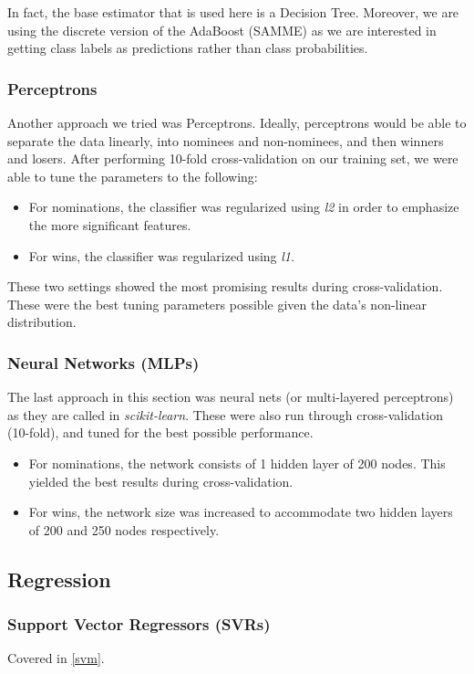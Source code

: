 \documentclass[journal,transmag]{IEEEtran}
\begin{document}
In fact, the base estimator that is used here is a Decision Tree. Moreover, we are using the discrete version of the AdaBoost (SAMME) as we are interested in getting class labels as predictions rather than class probabilities.
			
			\subsubsection{Perceptrons}
			Another approach we tried was Perceptrons. Ideally, perceptrons would be able to separate the data linearly, into nominees and non-nominees, and then winners and losers. After performing 10-fold cross-validation on our training set, we were able to tune the parameters to the following:
			\begin{itemize}
				\item For nominations, the classifier was regularized using \emph{l2} in order to emphasize the more significant features.
				\item For wins, the classifier was regularized using \emph{l1}.
			\end{itemize}
			These two settings showed the most promising results during cross-validation.
			These were the best tuning parameters possible given the data's non-linear distribution.
			
			\subsubsection{Neural Networks (MLPs)}
			The last approach in this section was neural nets (or multi-layered perceptrons) as they are called in \emph{scikit-learn}. These were also run through cross-validation (10-fold), and tuned for the best possible performance.
			\begin{itemize}
				\item For nominations, the network consists of 1 hidden layer of 200 nodes. This yielded the best results during cross-validation.
				\item For wins, the network size was increased to accommodate two hidden layers of 200 and 250 nodes respectively.
			\end{itemize}
			
		\subsection{Regression}
			
			\subsubsection{Support Vector Regressors (SVRs)}
			Covered in \ref{svm}.
			
\end{document}
